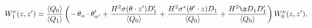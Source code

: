 \begin{equation}
W^{\nu}_{1}(z,z') =\frac{\langle Q_{0}\rangle }{\langle
Q_{1}\rangle}\left(-\,\theta_{\alpha}\cdot\theta'_{\alpha'}+
\frac{H^{2}\sigma(\theta\cdot z' )D'_{1}}{\langle Q_{0}\rangle }+
\frac{H^{2}\sigma^{*}(\theta'\cdot z) D_{1}}{\langle Q_{0}\rangle
}+ \frac{ H^2\z D_{1}D'_{1}}{\langle Q_{0}\rangle}\right)
W^{\nu}_{0}(z,z').\label{eq:vec}
\end{equation}

